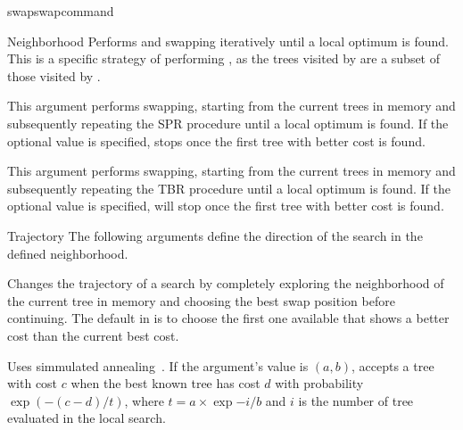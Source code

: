 \begin{command}{swap}{swapcommand}
\begin{arguments}
\begin{argumentgroup}{Neighborhood}
	     {Performs  and 
                swapping iteratively until a local optimum is found.
                This is a specific strategy of performing ,
                as the trees visited by  are a subset
                of those visited by .}
                {}

	{This argument performs  swapping, starting
                from the current trees in memory and subsequently repeating
                the SPR procedure until  a local optimum is found. If the optional value
                 is specified,  
                stops once the first tree with better cost is found.} 
                {}

	      {This argument performs  swapping, starting
                from the current trees in memory and subsequently repeating
                the TBR procedure until  a local optimum is found.  If the optional value
                 is specified,  
                will stop once the first tree with better cost is found.}
                {}

        \end{argumentgroup}

    \begin{argumentgroup}{Trajectory}
        {The following arguments define the direction of the search in the defined
        neighborhood.}

            {Changes the trajectory of a search by
            completely exploring the neighborhood of the current
            tree in memory and choosing the best swap position
            before continuing.
            The default in \poy is to choose the first one
            available that shows a better cost than the current
            best cost.}
            {}

            {Uses simmulated annealing~\cite{Kirkpatrick1983}. If the argument's value is $(a, b)$, 
            \poy accepts a tree with cost $c$ when the best known tree has
            cost $d$ with probability $\exp{(- (c - d) / t)}$, where
            $t = a \times \exp{- i / b}$ and $i$ is the number of tree
            evaluated in the local search.}
            {}


\end{argumentgroup}
\end{arguments}
\end{command}
